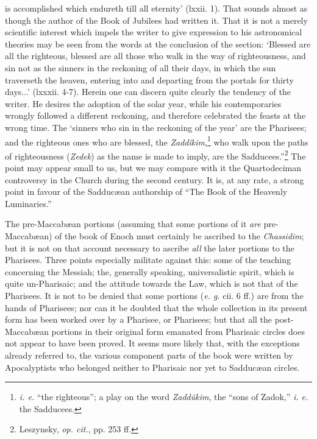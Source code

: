 is accomplished which endureth till all eternity’
(lxxii. 1). That sounds almost as though the author
of the Book of Jubilees had written it. That it is
not a merely scientific interest which impels the writer
to give expression to his astronomical theories may
be seen from the words at the conclusion of the
section: ‘Blessed are all the righteous, blessed are
all those who walk in the way of righteousness, and
sin not as the sinners in the reckoning of all their
days, in which the sun traverseth the heaven, entering
into and departing from the portals for thirty days...’
(lxxxii. 4-7). Herein one can discern quite clearly
the tendency of the writer. He desires the adoption
of the solar year, while his contemporaries wrongly
followed a different reckoning, and therefore celebrated
the feasts at the wrong time. The ‘sinners who sin
in the reckoning of the year’ are the Pharisees; and
the righteous ones who are blessed, the \emph{Zaddîkim},\footnote{\emph{i. e.} “the righteous”; a play on the word \emph{Zaddûkim},
the “sons of Zadok,” \emph{i. e.} the Sadducees.}
who walk upon the paths of righteousness (\emph{Zedek})
as the name is made to imply, are the Sadducees.”\footnote{Leszynsky, \emph{op. cit.}, pp. 253 ff.}
The point may appear small to us, but we may compare
with it the Quartodeciman controversy in the
Church during the second century. It is, at any rate,
a strong point in favour of the Sadducæan authorship
of “The Book of the Heavenly Luminaries.”

The pre-Maccabæan portions (assuming that some
portions of it \emph{are} pre-Maccabæan) of the book of
Enoch must certainly be ascribed to the \emph{Chassidim};
but it is not on that account necessary to ascribe \emph{all}
the later portions to the Pharisees. Three points
especially militate against this: some of the teaching
concerning the Messiah; the, generally speaking,
universalistic spirit, which is quite un-Pharisaic;
and the attitude towards the Law, which is not that
of the Pharisees. It is not to be denied that some
portions (\emph{e. g.} cii. 6 ff.) are from the hands of Pharisees;
nor can it be doubted that the whole collection in its
present form has been worked over by a Pharisee,
or Pharisees; but that all the post-Maccabæan
portions in their original form emanated from
Pharisaic circles does not appear to have been
proved. It seems more likely that, with the exceptions
already referred to, the various component
parts of the book were written by Apocalyptists who
belonged neither to Pharisaic nor yet to Sadducæan
circles.

